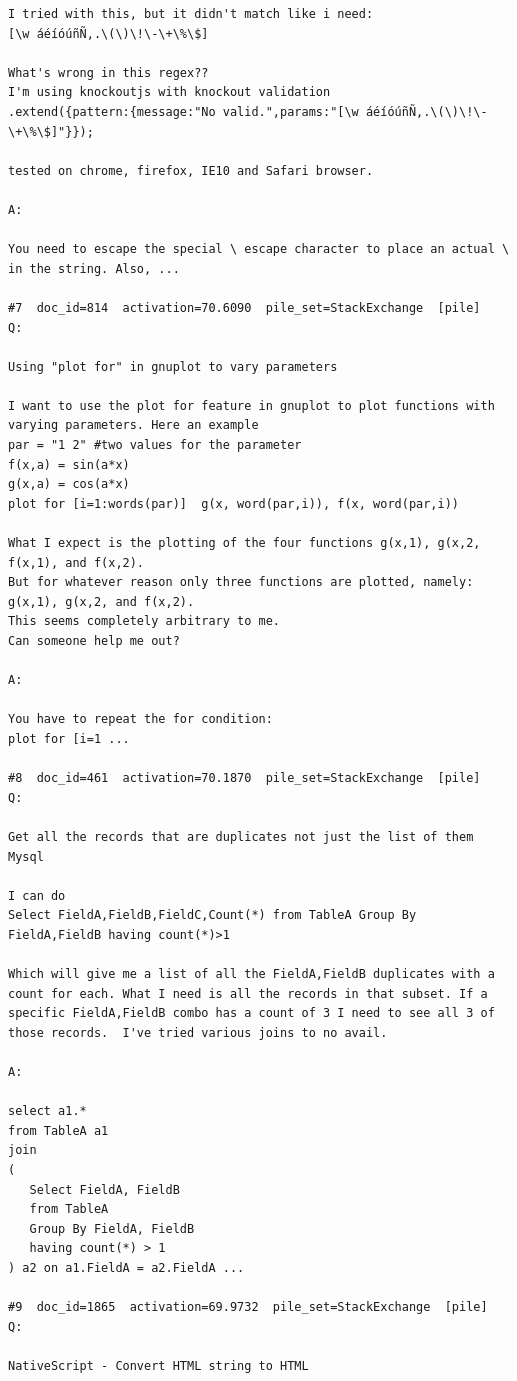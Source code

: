 \begin{verbatim}
I tried with this, but it didn't match like i need:
[\w áéíóúñÑ,.\(\)\!\-\+\%\$]

What's wrong in this regex??
I'm using knockoutjs with knockout validation 
.extend({pattern:{message:"No valid.",params:"[\w áéíóúñÑ,.\(\)\!\-\+\%\$]"}});

tested on chrome, firefox, IE10 and Safari browser.

A:

You need to escape the special \ escape character to place an actual \ in the string. Also, ...

#7  doc_id=814  activation=70.6090  pile_set=StackExchange  [pile]
Q:

Using "plot for" in gnuplot to vary parameters

I want to use the plot for feature in gnuplot to plot functions with varying parameters. Here an example
par = "1 2" #two values for the parameter
f(x,a) = sin(a*x)
g(x,a) = cos(a*x)
plot for [i=1:words(par)]  g(x, word(par,i)), f(x, word(par,i))

What I expect is the plotting of the four functions g(x,1), g(x,2, f(x,1), and f(x,2).
But for whatever reason only three functions are plotted, namely: g(x,1), g(x,2, and f(x,2).
This seems completely arbitrary to me.
Can someone help me out?

A:

You have to repeat the for condition:
plot for [i=1 ...

#8  doc_id=461  activation=70.1870  pile_set=StackExchange  [pile]
Q:

Get all the records that are duplicates not just the list of them Mysql

I can do
Select FieldA,FieldB,FieldC,Count(*) from TableA Group By FieldA,FieldB having count(*)>1

Which will give me a list of all the FieldA,FieldB duplicates with a count for each. What I need is all the records in that subset. If a specific FieldA,FieldB combo has a count of 3 I need to see all 3 of those records.  I've tried various joins to no avail.

A:

select a1.* 
from TableA a1
join
(
   Select FieldA, FieldB
   from TableA 
   Group By FieldA, FieldB 
   having count(*) > 1
) a2 on a1.FieldA = a2.FieldA ...

#9  doc_id=1865  activation=69.9732  pile_set=StackExchange  [pile]
Q:

NativeScript - Convert HTML string to HTML


\end{verbatim}
